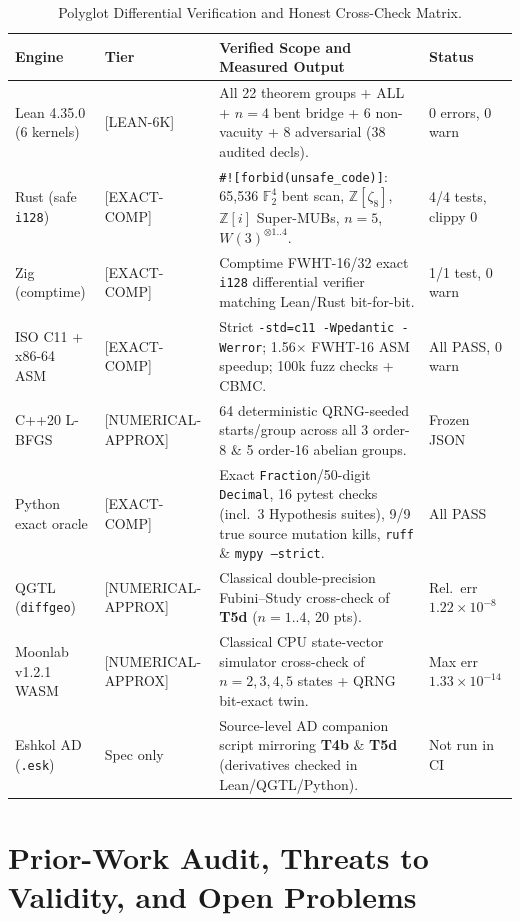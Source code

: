 \documentclass[11pt,reqno]{amsart}
\theoremstyle{definition}
\newcommand{\F}{\mathbb{F}}
\newcommand{\Z}{\mathbb{Z}}
\newcommand{\taglean}{\textsf{[LEAN-6K]}}
\newcommand{\tagcomp}{\textsf{[EXACT-COMP]}}
\newcommand{\tagnum}{\textsf{[NUMERICAL-APPROX]}}
\begin{document}
\begin{table}[htbp]
\centering
\caption{Polyglot Differential Verification and Honest Cross-Check Matrix.}
\label{tab:polyglot}
\small
\begin{tabularx}{\textwidth}{@{}P{3.3cm} l L P{2.6cm}@{}}
\toprule
\textbf{Engine} & \textbf{Tier} & \textbf{Verified Scope and Measured Output} & \textbf{Status} \\
\midrule
Lean 4.35.0 (6 kernels) & \taglean & All 22 theorem groups + ALL + $n=4$ bent bridge + 6 non-vacuity + 8 adversarial (38 audited decls). & 0 errors, 0 warn \\
Rust (safe \texttt{i128}) & \tagcomp & \texttt{\#![forbid(unsafe\_code)]}: 65{,}536 $\F_2^4$ bent scan, $\Z[\zeta_8]$, $\Z[i]$ Super-MUBs, $n=5$, $W(3)^{\otimes 1..4}$. & 4/4 tests, clippy 0 \\
Zig (comptime) & \tagcomp & Comptime FWHT-16/32 exact \texttt{i128} differential verifier matching Lean/Rust bit-for-bit. & 1/1 test, 0 warn \\
ISO C11 + x86-64 ASM & \tagcomp & Strict \texttt{-std=c11 -Wpedantic -Werror}; 1.56$\times$ FWHT-16 ASM speedup; 100k fuzz checks + CBMC. & All PASS, 0 warn \\
C++20 L-BFGS & \tagnum & 64 deterministic QRNG-seeded starts/group across all 3 order-8 \& 5 order-16 abelian groups. & Frozen JSON \\
Python exact oracle & \tagcomp & Exact \texttt{Fraction}/50-digit \texttt{Decimal}, 16 pytest checks (incl.\ 3 Hypothesis suites), 9/9 true source mutation kills, \texttt{ruff} \& \texttt{mypy --strict}. & All PASS \\
QGTL (\texttt{diffgeo}) & \tagnum & Classical double-precision Fubini--Study cross-check of \textbf{T5d} ($n=1..4$, 20 pts). & Rel.\ err $1.22\times 10^{-8}$ \\
Moonlab v1.2.1 WASM & \tagnum & Classical CPU state-vector simulator cross-check of $n=2,3,4,5$ states + QRNG bit-exact twin. & Max err $1.33\times 10^{-14}$ \\
Eshkol AD (\texttt{.esk}) & Spec only & Source-level AD companion script mirroring \textbf{T4b} \& \textbf{T5d} (derivatives checked in Lean/QGTL/Python). & Not run in CI \\
\bottomrule
\end{tabularx}
\end{table}

\section{Prior-Work Audit, Threats to Validity, and Open Problems}\label{sec:limits}
\end{document}
